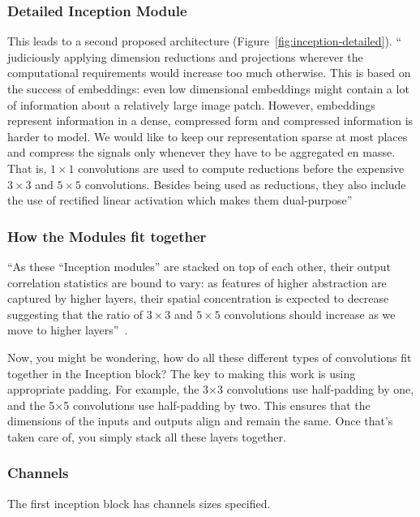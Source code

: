 \documentclass[11pt]{article}
\begin{document}
\subsubsection{Detailed Inception Module}

This leads to a second proposed architecture (Figure~\ref{fig:inception-detailed}). `` judiciously applying dimension reductions and projections wherever the computational requirements would increase too much otherwise. This is based on the success of embeddings: even low dimensional embeddings might contain a lot of information about a relatively large image patch. However, embeddings represent information in a dense, compressed form and compressed information is harder to model. We would like to keep our representation sparse at most places and compress the signals only whenever they have to be aggregated en masse. That is, $ 1\times1$ convolutions are used to compute reductions before the expensive $ 3\times3$ and $ 5\times5$ convolutions. Besides being used as reductions, they also include the use of rectified linear activation which makes them dual-purpose''~\cite{Inception}

\subsubsection{How the Modules fit together}

``As these “Inception modules” are stacked on top of each other, their output correlation statistics are bound to vary: as features of higher abstraction are captured by higher layers, their spatial concentration is expected to decrease suggesting that the ratio of $ 3\times3$ and $ 5\times5$ convolutions should increase as we move to higher layers''~\cite{Inception}.

Now, you might be wondering, how do all these different types of convolutions fit together in the Inception block? The key to making this work is using appropriate padding. For example, the 3$\times$3 convolutions use half-padding by one, and the 5$\times$5 convolutions use half-padding by two. This ensures that the dimensions of the inputs and outputs align and remain the same. Once that's taken care of, you simply stack all these layers together.

\subsubsection{Channels}

The first inception block has channels sizes specified.
\end{document}
